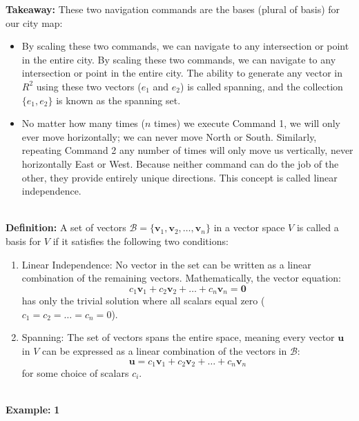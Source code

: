 \documentclass[DIV=20,oneside]{scrartcl}
\newcommand{\takeaway}[1]{%
	\begin{tcolorbox}[
		colback=black!20,
		colframe=black,
		boxrule=0.5pt,
		arc=2mm]
		\textbf{Takeaway: } #1
	\end{tcolorbox}
}
\newcommand{\example}{
	\noindent\textbf{\\Example: }
}
\newcommand{\deff}{
	\noindent\textbf{\\Definition: }
}
\begin{document}
\takeaway{These two navigation commands are the bases (plural of basis) for our city map: 
\begin{itemize}
	\item By scaling these two commands, we can navigate to any intersection or point in the entire city. By scaling these two commands, we can navigate to any intersection or point in the entire city. The ability to generate any vector in $R^2$ using these two vectors ($e_1$ and $e_2$) is called spanning, and the collection $\{e_1, e_2\}$ is known as the spanning set.
	\item No matter how many times ($n$ times) we execute Command 1, we will only ever move horizontally; we can never move North or South. Similarly, repeating Command 2 any number of times will only move us vertically, never horizontally East or West. Because neither command can do the job of the other, they provide entirely unique directions. This concept is called linear independence.
\end{itemize}}
\deff A set of vectors $\mathcal{B} = \{\mathbf{v}_1, \mathbf{v}_2, \dots, \mathbf{v}_n\}$ in a vector space $V$ is called a basis for $V$ if it satisfies the following two conditions:
\begin{enumerate}
	\item Linear Independence: No vector in the set can be written as a linear combination of the remaining vectors. Mathematically, the vector equation:$$c_1\mathbf{v}_1 + c_2\mathbf{v}_2 + \dots + c_n\mathbf{v}_n = \mathbf{0}$$has only the trivial solution where all scalars equal zero ($c_1 = c_2 = \dots = c_n = 0$).
	\item Spanning: The set of vectors spans the entire space, meaning every vector $\mathbf{u}$ in $V$ can be expressed as a linear combination of the vectors in $\mathcal{B}$:$$\mathbf{u} = c_1\mathbf{v}_1 + c_2\mathbf{v}_2 + \dots + c_n\mathbf{v}_n$$for some choice of scalars $c_i$.
\end{enumerate}
\example \textbf{1}
\renewcommand{\arraystretch}{1.5}
\end{document}
